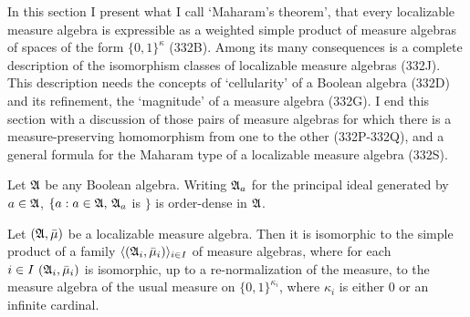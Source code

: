 
\def\chaptername{Maharam's theorem}
\def\sectionname{Classification of localizable measure algebras}


In this section I present what I call `Maharam's theorem', that every
localizable measure algebra is expressible as a weighted simple product
of measure algebras of spaces of the form $\{0,1\}^{\kappa}$ (332B).
Among its many
consequences is a complete description of the isomorphism classes of
localizable measure algebras (332J).   This description needs the
concepts of `cellularity' of a Boolean algebra (332D) and its
refinement, the `magnitude' of a measure algebra (332G).   I end this
section with a discussion of those pairs of measure algebras for which
there is a measure-preserving homomorphism from one to the other
(332P-332Q), and a general formula for the Maharam type of a localizable
measure algebra (332S).

 Let $\frak A$ be any Boolean algebra.   Writing
$\frak A_a$ for the principal ideal generated by $a\in\frak A$,
$\{a:a\in\frak A,\,\frak A_a$ is \Mth$\}$ is order-dense in $\frak A$.



 Let $(\frak A,\bar\mu)$ be a localizable
measure algebra.   Then it is isomorphic to the simple product of a
family $\langle(\frak A_i,\bar\mu_i)\rangle_{i\in I}$ of measure
algebras, where for each $i\in I\,\,(\frak A_i,\bar\mu_i)$ is isomorphic,
up to a re-normalization of
the measure, to the measure algebra of the usual measure on
$\{0,1\}^{\kappa_i}$, where $\kappa_i$ is either $0$ or an infinite
cardinal.

